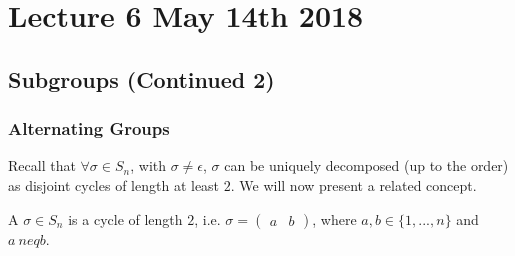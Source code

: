 \chapter{Lecture 6 May 14th 2018}
\label{chp:lecture_6_may_14th_2018}

\section{Subgroups (Continued 2)}
\label{sec:subgroups_continued_2}

\subsection{Alternating Groups}
\label{sub:alternating_groups}

Recall that $\forall \sigma \in S_n$, with $\sigma \neq \epsilon$, $\sigma$ can be uniquely decomposed (up to the order) as disjoint cycles of length at least $2$. We will now present a related concept.

\begin{defn}[Transposition]\label{defn:transposition}
  A  $\sigma \in S_n$ is a cycle of length $2$, i.e. $\sigma = \begin{pmatrix} a & b \end{pmatrix}$, where $a, b \in \{1, ..., n\}$ and $a\ neq b$.
\end{defn}

